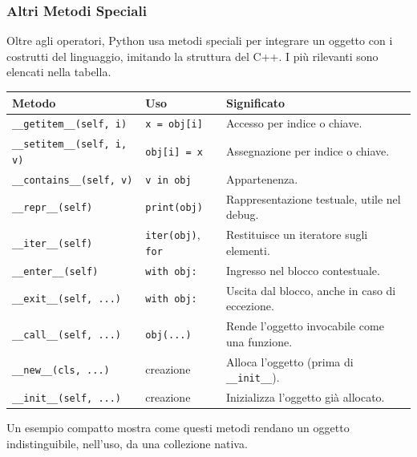 \documentclass[12pt]{extarticle}
\begin{document}
\subsubsection{Altri Metodi Speciali}

\noindent Oltre agli operatori, Python usa metodi speciali per integrare un oggetto con i costrutti del linguaggio, imitando la struttura del C++. I più rilevanti sono elencati nella tabella.

\begin{center}
\small
\begin{tabular}{p{4.6cm}p{4.4cm}p{5.4cm}}
    \toprule
    \textbf{Metodo} & \textbf{Uso} & \textbf{Significato} \\
    \midrule
    \texttt{\_\_getitem\_\_(self, i)} & \texttt{x = obj[i]} & Accesso per indice o chiave. \\
    \addlinespace
    \texttt{\_\_setitem\_\_(self, i, v)} & \texttt{obj[i] = x} & Assegnazione per indice o chiave. \\
    \addlinespace
    \texttt{\_\_contains\_\_(self, v)} & \texttt{v in obj} & Appartenenza. \\
    \addlinespace
    \texttt{\_\_repr\_\_(self)} & \texttt{print(obj)} & Rappresentazione testuale, utile nel debug. \\
    \addlinespace
    \texttt{\_\_iter\_\_(self)} & \texttt{iter(obj)}, \texttt{for} & Restituisce un iteratore sugli elementi. \\
    \addlinespace
    \texttt{\_\_enter\_\_(self)} & \texttt{with obj:} & Ingresso nel blocco contestuale. \\
    \addlinespace
    \texttt{\_\_exit\_\_(self, ...)} & \texttt{with obj:} & Uscita dal blocco, anche in caso di eccezione. \\
    \addlinespace
    \texttt{\_\_call\_\_(self, ...)} & \texttt{obj(...)} & Rende l'oggetto invocabile come una funzione. \\
    \addlinespace
    \texttt{\_\_new\_\_(cls, ...)} & creazione & Alloca l'oggetto (prima di \texttt{\_\_init\_\_}). \\
    \addlinespace
    \texttt{\_\_init\_\_(self, ...)} & creazione & Inizializza l'oggetto già allocato. \\
    \bottomrule
\end{tabular}
\end{center}

\noindent Un esempio compatto mostra come questi metodi rendano un oggetto indistinguibile, nell'uso, da una collezione nativa.
\end{document}
